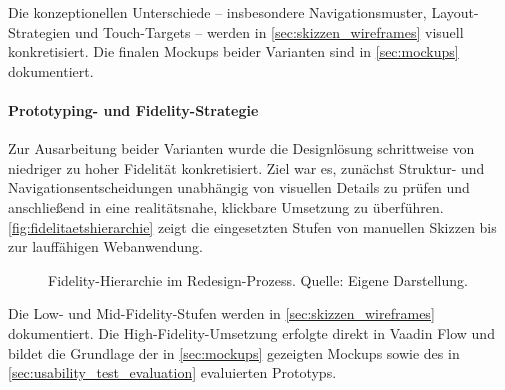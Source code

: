 Die konzeptionellen Unterschiede -- insbesondere Navigationsmuster, Layout-Strategien und Touch-Targets -- werden in \autoref{sec:skizzen_wireframes} visuell konkretisiert. Die finalen Mockups beider Varianten sind in \autoref{sec:mockups} dokumentiert.

\paragraph{Prototyping- und Fidelity-Strategie}
Zur Ausarbeitung beider Varianten wurde die Designlösung schrittweise von niedriger zu hoher Fidelität konkretisiert. Ziel war es, zunächst Struktur- und Navigationsentscheidungen unabhängig von visuellen Details zu prüfen und anschließend in eine realitätsnahe, klickbare Umsetzung zu überführen. \autoref{fig:fidelitaetshierarchie} zeigt die eingesetzten Stufen von manuellen Skizzen bis zur lauffähigen Webanwendung.

\begin{figure}[ht!]
    \centering
    \caption[Fidelity-Hierarchie]{Fidelity-Hierarchie im Redesign-Prozess. Quelle: Eigene Darstellung.}
    \label{fig:fidelitaetshierarchie}
\end{figure}

Die Low- und Mid-Fidelity-Stufen werden in \autoref{sec:skizzen_wireframes} dokumentiert. Die High-Fidelity-Umsetzung erfolgte direkt in Vaadin Flow und bildet die Grundlage der in \autoref{sec:mockups} gezeigten Mockups sowie des in \autoref{sec:usability_test_evaluation} evaluierten Prototyps.
